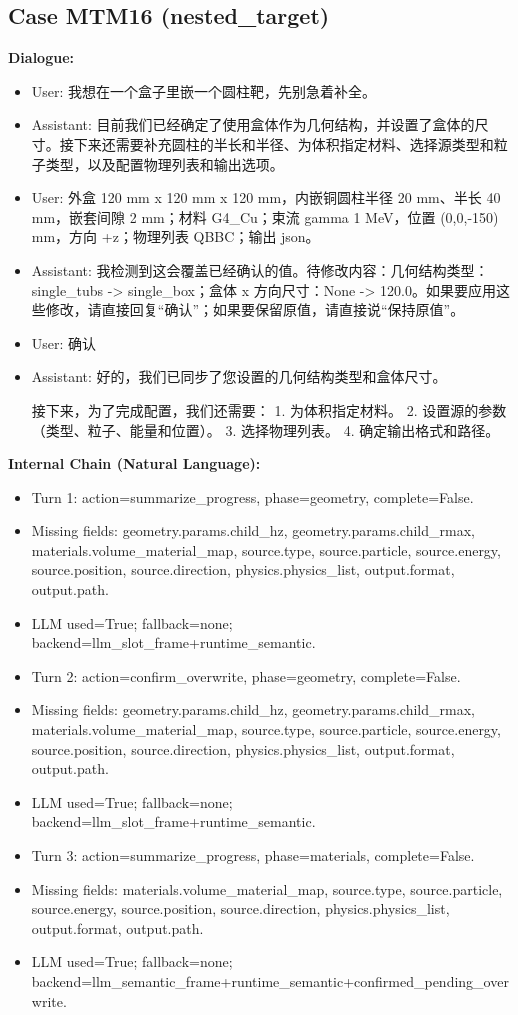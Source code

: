 \documentclass[11pt]{ctexart}
\begin{document}
\subsection{Case MTM16 (nested\_target)}
\textbf{Dialogue:}
\begin{itemize}
\item User: 我想在一个盒子里嵌一个圆柱靶，先别急着补全。
\item Assistant: 目前我们已经确定了使用盒体作为几何结构，并设置了盒体的尺寸。接下来还需要补充圆柱的半长和半径、为体积指定材料、选择源类型和粒子类型，以及配置物理列表和输出选项。
\item User: 外盒 120 mm x 120 mm x 120 mm，内嵌铜圆柱半径 20 mm、半长 40 mm，嵌套间隙 2 mm；材料 G4\_Cu；束流 gamma 1 MeV，位置 (0,0,-150) mm，方向 +z；物理列表 QBBC；输出 json。
\item Assistant: 我检测到这会覆盖已经确认的值。待修改内容：几何结构类型：single\_tubs -> single\_box；盒体 x 方向尺寸：None -> 120.0。如果要应用这些修改，请直接回复“确认”；如果要保留原值，请直接说“保持原值”。
\item User: 确认
\item Assistant: 好的，我们已同步了您设置的几何结构类型和盒体尺寸。

接下来，为了完成配置，我们还需要：
1.  为体积指定材料。
2.  设置源的参数（类型、粒子、能量和位置）。
3.  选择物理列表。
4.  确定输出格式和路径。
\end{itemize}
\textbf{Internal Chain (Natural Language):}
\begin{itemize}
\item Turn 1: action=summarize\_progress, phase=geometry, complete=False.
\item Missing fields: geometry.params.child\_hz, geometry.params.child\_rmax, materials.volume\_material\_map, source.type, source.particle, source.energy, source.position, source.direction, physics.physics\_list, output.format, output.path.
\item LLM used=True; fallback=none; backend=llm\_slot\_frame+runtime\_semantic.
\item Turn 2: action=confirm\_overwrite, phase=geometry, complete=False.
\item Missing fields: geometry.params.child\_hz, geometry.params.child\_rmax, materials.volume\_material\_map, source.type, source.particle, source.energy, source.position, source.direction, physics.physics\_list, output.format, output.path.
\item LLM used=True; fallback=none; backend=llm\_slot\_frame+runtime\_semantic.
\item Turn 3: action=summarize\_progress, phase=materials, complete=False.
\item Missing fields: materials.volume\_material\_map, source.type, source.particle, source.energy, source.position, source.direction, physics.physics\_list, output.format, output.path.
\item LLM used=True; fallback=none; backend=llm\_semantic\_frame+runtime\_semantic+confirmed\_pending\_overwrite.
\end{itemize}
\end{document}
